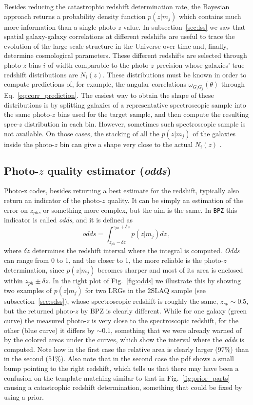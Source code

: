 Besides reducing the catastrophic redshift determination rate, the Bayesian approach returns a probability density function $p(z|m_j)$ which contains much more information than a single photo-$z$ value. In subsection~\ref{sec:lss} we saw that spatial galaxy-galaxy correlations at different redshifts are useful to trace the evolution of the large scale structure in the Universe over time and, finally, determine cosmological parameters. These different redshifts are selected through photo-$z$ bins $i$ of width comparable to the photo-$z$ precision whose galaxies' true redshift distributions are $N_i(z)$. These distributions must be known in order to compute predictions of, for example, the angular correlations $\omega_{G_i G_j}(\theta)$ through Eq.~\ref{eq:corr_prediction}. The easiest way to obtain the shape of these distributions is by splitting galaxies of a representative spectroscopic sample into the same photo-$z$ bins used for the target sample, and then compute the resulting spec-$z$ distribution in each bin. However, sometimes such spectroscopic sample is not available. On those cases, the stacking of all the $p(z|m_j)$ of the galaxies inside the photo-$z$ bin can give a shape very close to the actual $N_i(z)$ \citep{Bonnett2013}.

\subsection{Photo-$z$ quality estimator (\textit{odds})}
Photo-z codes, besides returning a best estimate for the redshift, typically also return an indicator of the photo-$z$ quality. It can be simply an estimation of the error on $z_{ph}$, or something more complex, but the aim is the same. In \texttt{BPZ} this indicator is called \textit{odds}, and it is defined as
\begin{equation}
odds = \int^{z_{ph}+\delta z}_{z_{ph}-\delta z}p(z|m_j)dz \, ,
\label{odds}
\end{equation}
where $\delta z$ determines the redshift interval where the integral is computed. \textit{Odds} can range from 0 to 1, and the closer to 1, the more reliable is the photo-$z$ determination, since $p(z|m_j)$ becomes sharper and most of its area is enclosed within $z_{ph}\pm \delta z$. In the right plot of Fig.~\ref{fig:odds} we illustrate this by showing two examples of $p(z|m_j)$ for two LRGs in the 2SLAQ sample (see subsection~\ref{sec:sdss}), whose spectroscopic redshift is roughly the same, $z_{sp} \sim 0.5$, but the returned photo-$z$ by BPZ is clearly different. While for one galaxy (green curve) the measured photo-$z$ is very close to the spectroscopic redshift, for the other (blue curve) it differs by $\sim0.1$, something that we were already warned of by the colored areas under the curves, which show the interval where the \textit{odds} is computed. Note how in the first case the relative area is clearly larger (97\%) than in the second (51\%). Also note that in the second case the pdf shows a small bump pointing to the right redshift, which tells us that there may have been a confusion on the template matching similar to that in Fig.~\ref{fig:prior_parts} causing a catastrophic redshift determination, something that could be fixed by using a prior.

